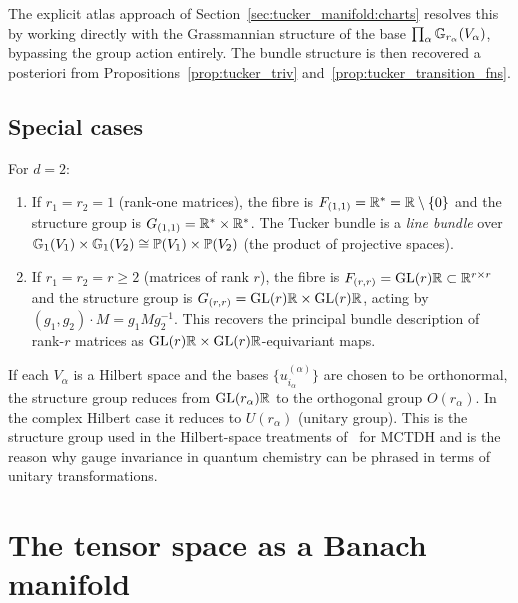 The explicit atlas approach of Section~\ref{sec:tucker_manifold:charts}
resolves this by working directly with the Grassmannian structure of
the base $\prod_\alpha \mathbb{G}_{r_\alpha}(V_\alpha)$, bypassing the
group action entirely. The bundle structure is then recovered
a posteriori from Propositions~\ref{prop:tucker_triv}
and~\ref{prop:tucker_transition_fns}.

\subsection*{Special cases}

\begin{example}[$d = 2$: line bundle and matrix bundle]
\label{ex:tucker_d2_bundle}
For $d = 2$:
\begin{enumerate}
\item[\textup{(i)}] If $r_1 = r_2 = 1$ (rank-one matrices), the fibre
    is $F_{(1,1)} = \mathbb{R}^* = \mathbb{R} \setminus \{0\}$ and the structure
    group is $G_{(1,1)} = \mathbb{R}^* \times \mathbb{R}^*$. The Tucker bundle is
    a \emph{line bundle} over
    $\mathbb{G}_{1}(V_1) \times \mathbb{G}_{1}(V_2)
    \cong \mathbb{P}(V_1) \times \mathbb{P}(V_2)$ (the product of
    projective spaces).
\item[\textup{(ii)}] If $r_1 = r_2 = r \geq 2$ (matrices of rank $r$),
    the fibre is $F_{(r,r)} = \mathrm{GL}(r){\mathbb{R}} \subset \mathbb{R}^{r \times r}$
    and the structure group is $G_{(r,r)} = \mathrm{GL}(r){\mathbb{R}} \times
    \mathrm{GL}(r){\mathbb{R}}$, acting by $(g_1, g_2) \cdot M = g_1 M g_2^{-1}$.
    This recovers the principal bundle description of rank-$r$ matrices
    as $\mathrm{GL}(r){\mathbb{R}} \times \mathrm{GL}(r){\mathbb{R}}$-equivariant maps.
\end{enumerate}
\end{example}

\begin{example}
\label{ex:tucker_hilbert_bundle}
If each $V_\alpha$ is a Hilbert space and the bases
$\{u^{(\alpha)}_{i_\alpha}\}$ are chosen to be orthonormal, the
structure group reduces from $\mathrm{GL}(r_\alpha){\mathbb{R}}$ to the orthogonal
group $O(r_\alpha)$. In the complex Hilbert case it reduces to
$U(r_\alpha)$ (unitary group). This is the structure group used in the
Hilbert-space treatments of~\cite{KochLubich2007} for MCTDH and is
the reason why gauge invariance in quantum chemistry can be phrased
in terms of unitary transformations.
\end{example}

\section{The tensor space as a Banach manifold}
\label{sec:tucker_manifold:full}

